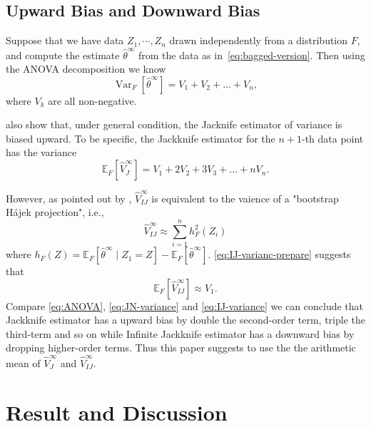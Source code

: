 \documentclass[11pt]{article}
\begin{document}
\subsection{Upward Bias and Downward Bias}
Suppose that we have data $Z_1, \cdots, Z_n$ drawn independently from a distribution $F$, and compute the estimate $\hat{\theta}^{\infty}$ from the data as in~\ref{eq:bagged-version}.
Then using the ANOVA decomposition \cite{efron1981jackknife} we know
\begin{equation}
	\label{eq:ANOVA}
	\operatorname{Var}_{F}\left[\hat{\theta}^{\infty}\right]=V_{1}+V_{2}+\ldots+V_{n},
\end{equation}
where $V_k$ are all non-negative.

\cite{efron1981jackknife} also show that, under general condition, the Jacknife estimator of variance is biased upward. To be specific, the Jackknife estimator for the $n+1$-th data point has the variance 
\begin{equation}
	\label{eq:JN-variance}
	\mathbb{E}_{F}\left[\widehat{V}_{J}^{\infty}\right]=V_{1}+2 V_{2}+3 V_{3}+\ldots+n V_{n}.
\end{equation}

However, as pointed out by \cite{IJ, efron2012model}, $\hat{V}_{IJ}^{\infty}$ is equivalent to the vaience of a "bootstrap Hájek projection", i.e.,
\begin{equation}
	\label{eq:IJ-varianc-prepare}
	\widehat{V}_{I J}^{\infty} \approx \sum_{i=1}^{n} h_{F}^{2}\left(Z_{i}\right)
\end{equation}
where $h_{F}(Z)=\mathbb{E}_{F}\left[\hat{\theta}^{\infty} \mid Z_{1}=Z\right]-\mathbb{E}_{F}\left[\hat{\theta}^{\infty}
\right]$.
\eqref{eq:IJ-varianc-prepare} suggests that 
\begin{equation}
	\label{eq:IJ-variance}
	\mathbb{E}_{F}\left[\widehat{V}_{I J}^{\infty}\right] \approx V_{1}.
\end{equation}
Compare \eqref{eq:ANOVA}, \eqref{eq:JN-variance} and \eqref{eq:IJ-variance} we can conclude that Jackknife estimator has a upward bias by double the second-order term, triple the third-term and so on while Infinite Jackknife estimator has a downward bias by dropping higher-order terms.
Thus this paper suggests to use the the arithmetic mean of $\widehat{V}_{J}^{\infty}$ and $\widehat{V}_{IJ}^{\infty}$.

\section{Result and Discussion}
\end{document}

